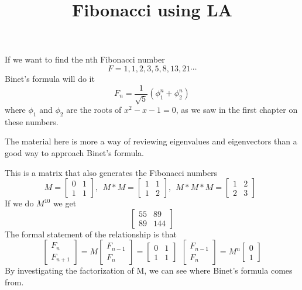 \documentclass[11pt, oneside]{article}
\title{Fibonacci using LA}
\date{}
\begin{document}
\maketitle
\Large

If we want to find the nth Fibonacci number
\[ F = 1,1,2,3,5,8,13,21 \cdots \]
Binet's formula will do it
\[ F_n = \frac{1}{\sqrt{5}} (\phi_1^n + \phi_2^n) \]
where $\phi_1$ and $\phi_2$ are the roots of $x^2 - x - 1 = 0$,
as we saw in the first chapter on these numbers.

The material here is more a way of reviewing eigenvalues and eigenvectors than a good way to approach Binet's formula.

This is a matrix that also generates the Fibonacci numbers 
\[ M = 
\begin{bmatrix} 
  0  &  1 \\ 
  1  &  1 
\end{bmatrix}, \ \ 
M * M = 
\begin{bmatrix} 
  1  &  1 \\ 
  1  &  2 
\end{bmatrix}, \ \ 
M * M * M = 
\begin{bmatrix} 
  1  &  2 \\ 
  2  &  3 
\end{bmatrix} \ \ 
\]
If we do $M^{10}$ we get
\[
\begin{bmatrix} 
  55  &  89 \\ 
  89  &  144 
\end{bmatrix}
\]
The formal statement of the relationship is that
\[
\begin{bmatrix} 
  F_{n} \\ 
  F_{n+1} 
\end{bmatrix} =
M
\begin{bmatrix} 
  F_{n-1} \\ 
  F_{n} 
\end{bmatrix}
=
\begin{bmatrix} 
  0  &  1 \\ 
  1  &  1 
\end{bmatrix} \ \ 
\begin{bmatrix} 
  F_{n-1} \\ 
  F_{n} 
\end{bmatrix}
=
M^n
\begin{bmatrix} 
  0 \\ 
  1 
\end{bmatrix}
\]
By investigating the factorization of M, we can see where Binet's formula comes from.
\end{document}
